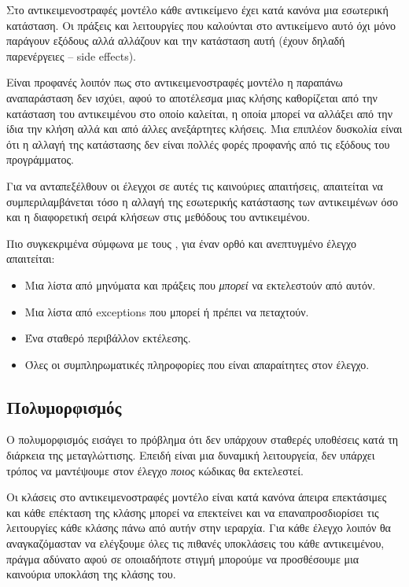 \documentclass[12pt]{article}
\begin{document}
\par Στο αντικειμενοστραφές μοντέλο κάθε αντικείμενο έχει κατά κανόνα μια εσωτερική κατάσταση. Οι πράξεις και λειτουργίες που καλούνται στο αντικείμενο αυτό όχι μόνο παράγουν εξόδους αλλά αλλάζουν και την κατάσταση αυτή (έχουν δηλαδή παρενέργειες – side effects).

\par Είναι προφανές λοιπόν πως στο αντικειμενοστραφές μοντέλο η παραπάνω αναπαράσταση δεν ισχύει, αφού το αποτέλεσμα μιας κλήσης καθορίζεται από την κατάσταση του αντικειμένου στο οποίο καλείται, η οποία μπορεί να αλλάξει από την ίδια την κλήση αλλά και από άλλες ανεξάρτητες κλήσεις. Μια επιπλέον δυσκολία είναι ότι η αλλαγή της κατάστασης δεν είναι πολλές φορές προφανής από τις εξόδους του προγράμματος.

\par Για να ανταπεξέλθουν οι έλεγχοι σε αυτές τις καινούριες απαιτήσεις, απαιτείται να συμπεριλαμβάνεται τόσο η αλλαγή της εσωτερικής κατάστασης των αντικειμένων όσο και η διαφορετική σειρά κλήσεων στις μεθόδους του αντικειμένου.

\par Πιο συγκεκριμένα σύμφωνα με τους \textcite{gordon}, για έναν ορθό και ανεπτυγμένο έλεγχο απαιτείται:

\begin{itemize}
\item Μια λίστα από μηνύματα και πράξεις που \textit{μπορεί} να εκτελεστούν από αυτόν.
\item Μια λίστα από exceptions που μπορεί ή πρέπει να πεταχτούν.
\item Ένα σταθερό περιβάλλον εκτέλεσης.
\item Όλες οι συμπληρωματικές πληροφορίες που είναι απαραίτητες στον έλεγχο.
\end{itemize}

\subsection{Πολυμορφισμός}

\par Ο πολυμορφισμός εισάγει το πρόβλημα ότι δεν υπάρχουν σταθερές υποθέσεις κατά τη διάρκεια της μεταγλώττισης. Επειδή είναι μια δυναμική λειτουργεία, δεν υπάρχει τρόπος να μαντέψουμε στον έλεγχο \textit{ποιος} κώδικας θα εκτελεστεί.

\par Οι κλάσεις στο αντικειμενοστραφές μοντέλο είναι κατά κανόνα άπειρα επεκτάσιμες και κάθε επέκταση της κλάσης μπορεί να επεκτείνει και να επαναπροσδιορίσει τις λειτουργίες κάθε κλάσης πάνω από αυτήν στην ιεραρχία. Για κάθε έλεγχο λοιπόν θα αναγκαζόμασταν να ελέγξουμε όλες τις πιθανές υποκλάσεις του κάθε αντικειμένου, πράγμα αδύνατο αφού σε οποιαδήποτε στιγμή μπορούμε να προσθέσουμε μια καινούρια υποκλάση της κλάσης του.
\end{document}
